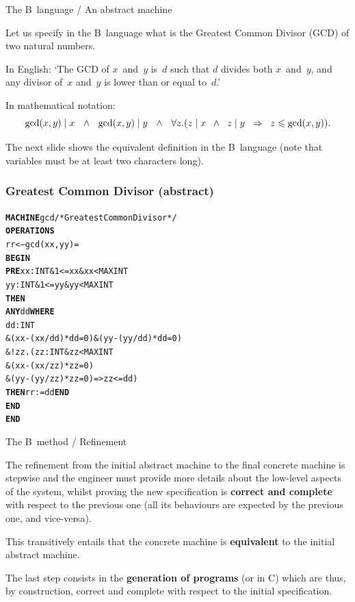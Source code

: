 \documentclass[compress,dvipdfmx]{beamer}
\begin{document}
\begin{frame}{The B~language / An abstract machine}

  Let us specify in the B~language what is the Greatest Common Divisor
  (GCD) of two natural numbers.

  \bigskip

  In English: `The GCD of \(x\)~and~\(y\) is~\(d\) such that \(d\)
  divides both \(x\)~and~\(y\), and any divisor of~\(x\) and~\(y\) is
  lower than or equal to~\(d\).'

  \bigskip

  In mathematical notation:
  \begin{equation*}
    \tiny
    \gcd(x,y) \mid x \quad\land\quad
    \gcd(x,y) \mid y \quad\wedge\quad
    \forall z.(z \mid x \;\;\wedge\;\; z \mid y
    \;\; \Rightarrow\;\; z \leqslant \gcd(x,y)).
  \end{equation*}

  The next slide shows the equivalent definition in the B~language
  (note that variables must be at least two characters long).

\end{frame}


\begin{frame}[fragile]
  \frametitle{Greatest Common Divisor (abstract)}

\begin{alltt}
\small
\textbf{MACHINE} gcd /* Greatest Common Divisor */
\textbf{OPERATIONS}
  rr <-- gcd (xx,yy) =
    \textbf{BEGIN}
      \textbf{PRE} xx : INT \& 1 <= xx \& xx < MAXINT
          yy : INT \& 1 <= yy \& yy < MAXINT
      \textbf{THEN}
        \textbf{ANY} dd \textbf{WHERE}
         dd : INT
            \& (xx-(xx/dd)*dd = 0) \& (yy-(yy/dd)*dd = 0)
            \& !zz.(zz : INT \& zz < MAXINT
                   \& (xx-(xx/zz)*zz = 0)
                   \& (yy-(yy/zz)*zz = 0) => zz <= dd)
        \textbf{THEN} rr := dd \textbf{END}
      \textbf{END}
    \textbf{END}
\end{alltt}

\end{frame}


\begin{frame}{The B~method / Refinement}

  The refinement from the initial abstract machine to the final
  concrete machine is stepwise and the engineer must provide more
  details about the low\hyp{}level aspects of the system, whilst
  proving the new specification is \textbf{correct and complete} with
  respect to the previous one (all its behaviours are expected by the
  previous one, and vice\hyp{}versa).

  \bigskip

  This transitively entails that the concrete machine is
  \textbf{equivalent} to the initial abstract machine.

  \bigskip

  The last step consists in the \textbf{generation of \Ada programs}
  (or in \textsf{C}) which are thus, by construction, correct and
  complete with respect to the initial specification.

\end{frame}
\end{document}
